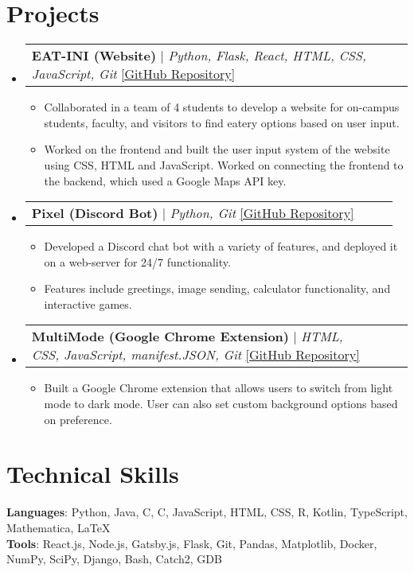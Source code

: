 \documentclass[letterpaper,11pt]{article}
\makeatletter
\newcommand{\resumeItem}[1]{
  \item\small{
    {#1 \vspace{-2pt}}
  }
}
\newcommand{\CC}{C\nolinebreak\hspace{-.05em}\raisebox{.4ex}{\tiny\bf +}\nolinebreak\hspace{-.10em}\raisebox{.4ex}{\tiny\bf +}}
\def\CC{{C\nolinebreak[4]\hspace{-.05em}\raisebox{.4ex}{\tiny\bf ++}}}
\newcommand{\resumeProjectHeading}[2]{
    \item
    \begin{tabular*}{0.97\textwidth}{l@{\extracolsep{\fill}}r}
      \small#1 & #2 \\
    \end{tabular*}\vspace{-7pt}
}
\newcommand{\resumeSubHeadingListStart}{\begin{itemize}[leftmargin=0.15in, label={}]}
\newcommand{\resumeSubHeadingListEnd}{\end{itemize}}
\newcommand{\resumeItemListStart}{\begin{itemize}}
\newcommand{\resumeItemListEnd}{\end{itemize}\vspace{-5pt}}
\makeatother
\begin{document}
\section{Projects}
    \resumeSubHeadingListStart
      \resumeProjectHeading
          {\textbf{EAT-INI (Website)} $|$ \emph{Python, Flask, React, HTML, CSS, JavaScript, Git} \href{https://github.com/CS196Illinois/Group1-SP22}{\color{blue}[GitHub Repository]}}{~~~}
          \resumeItemListStart
            \resumeItem{Collaborated in a team of 4 students to develop a website for on-campus students, faculty, and visitors to find eatery options based on user input.} 
            \resumeItem{Worked on the frontend and built the user input system of the website using CSS, HTML and JavaScript. Worked on connecting the frontend to the backend, which used a Google Maps API key.}
          \resumeItemListEnd
      \resumeProjectHeading
          {\textbf{Pixel (Discord Bot)} $|$ \emph{Python, Git} \href{https://github.com/RamGoenka/pixel}{\color{blue}[GitHub Repository]}}{~~~}
          \resumeItemListStart
            \resumeItem{Developed a Discord chat bot with a variety of features, and deployed it on a web-server for 24/7 functionality.}
            \resumeItem{Features include greetings, image sending, calculator functionality, and interactive games.}
          \resumeItemListEnd
        \resumeProjectHeading
          {\textbf{MultiMode (Google Chrome Extension)} $|$ \emph{HTML, CSS, JavaScript, manifest.JSON, Git} \href{https://github.com/RamGoenka/MutliMode}{\color{blue}[GitHub Repository]}}{~~~}
          \resumeItemListStart
            \resumeItem{Built a Google Chrome extension that allows users to switch from light mode to dark mode. User can also set custom background options based on preference.}
            \resumeItemListEnd
    \resumeSubHeadingListEnd
    
\section{Technical Skills}
 \begin{itemize}[leftmargin=0.10in, label={}]
    \small{\item{
     \textbf{Languages}{: Python, Java, C, \CC, JavaScript, HTML, CSS, R, Kotlin, TypeScript, Mathematica, \LaTeX} \\
     \textbf{Tools}{: React.js, Node.js, Gatsby.js, Flask, Git, Pandas, Matplotlib, Docker, NumPy, SciPy, Django, Bash, Catch2, GDB} 
    }}
 \end{itemize}
\end{document}
